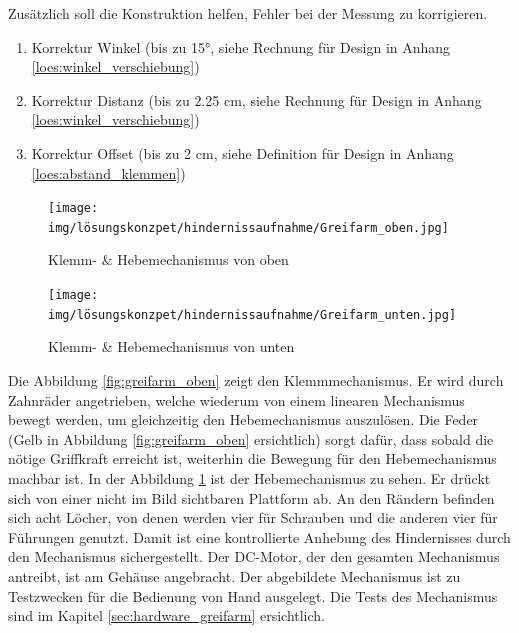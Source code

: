 \documentclass[../main.tex]{subfiles}
\begin{document}
Zusätzlich soll die Konstruktion helfen, Fehler bei der Messung zu korrigieren.
\begin{enumerate}
    \item Korrektur Winkel (bis zu 15°, siehe Rechnung für Design in Anhang \ref{loes:winkel_verschiebung})
    \item Korrektur Distanz (bis zu 2.25 cm, siehe Rechnung für Design in Anhang \ref{loes:winkel_verschiebung})
    \item Korrektur Offset (bis zu 2 cm, siehe Definition für Design in Anhang \ref{loes:abstand_klemmen})
\end{enumerate}

\begin{figure}[H]
    \centering
    \begin{minipage}[t]{0.45\textwidth}
        \centering
        \texttt{[image: img/lösungskonzpet/hindernissaufnahme/Greifarm\_oben.jpg]}
        \caption{Klemm- \& Hebemechanismus von oben}
        \label{fig:greifarm_oben}
    \end{minipage}
    \hfill
    \begin{minipage}[t]{0.45\textwidth}
        \centering
        \texttt{[image: img/lösungskonzpet/hindernissaufnahme/Greifarm\_unten.jpg]}
        \caption{Klemm- \& Hebemechanismus von unten}
        \label{fig:greifarm_unten}
    \end{minipage}
\end{figure}
Die Abbildung \ref{fig:greifarm_oben} zeigt den Klemmmechanismus. Er wird durch Zahnräder angetrieben, welche wiederum von einem linearen Mechanismus bewegt werden, um gleichzeitig den Hebemechanismus auszulösen. Die Feder (Gelb in Abbildung \ref{fig:greifarm_oben} ersichtlich) sorgt dafür, dass sobald die nötige Griffkraft erreicht ist, weiterhin die Bewegung für den Hebemechanismus machbar ist. In der Abbildung \ref{fig:greifarm_unten} ist der Hebemechanismus zu sehen. Er drückt sich von einer nicht im Bild sichtbaren Plattform ab. An den Rändern befinden sich acht Löcher, von denen werden vier für Schrauben und die anderen vier für Führungen genutzt. Damit ist eine kontrollierte Anhebung des Hindernisses durch den Mechanismus sichergestellt.
Der DC-Motor, der den gesamten Mechanismus antreibt, ist am Gehäuse angebracht.
Der abgebildete Mechanismus ist zu Testzwecken für die Bedienung von Hand ausgelegt. Die Tests des Mechanismus sind im Kapitel \ref{sec:hardware_greifarm} ersichtlich.
\end{document}
